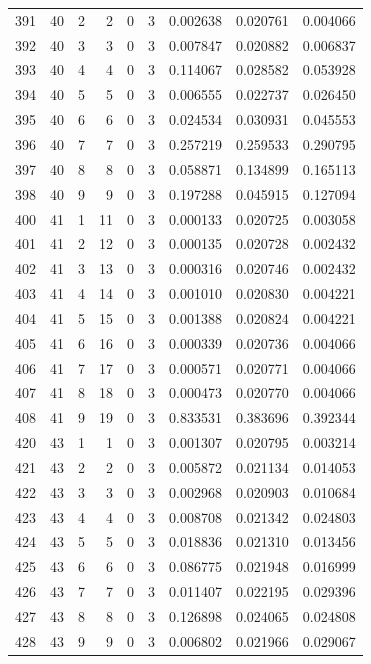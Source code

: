 \begin{longtable}{rrrrrrrrr}
391 & 40 & 2 & 2 & 0 & 3 & 0.002638 & 0.020761 & 0.004066 \\
392 & 40 & 3 & 3 & 0 & 3 & 0.007847 & 0.020882 & 0.006837 \\
393 & 40 & 4 & 4 & 0 & 3 & 0.114067 & 0.028582 & 0.053928 \\
394 & 40 & 5 & 5 & 0 & 3 & 0.006555 & 0.022737 & 0.026450 \\
395 & 40 & 6 & 6 & 0 & 3 & 0.024534 & 0.030931 & 0.045553 \\
396 & 40 & 7 & 7 & 0 & 3 & 0.257219 & 0.259533 & 0.290795 \\
397 & 40 & 8 & 8 & 0 & 3 & 0.058871 & 0.134899 & 0.165113 \\
398 & 40 & 9 & 9 & 0 & 3 & 0.197288 & 0.045915 & 0.127094 \\
400 & 41 & 1 & 11 & 0 & 3 & 0.000133 & 0.020725 & 0.003058 \\
401 & 41 & 2 & 12 & 0 & 3 & 0.000135 & 0.020728 & 0.002432 \\
402 & 41 & 3 & 13 & 0 & 3 & 0.000316 & 0.020746 & 0.002432 \\
403 & 41 & 4 & 14 & 0 & 3 & 0.001010 & 0.020830 & 0.004221 \\
404 & 41 & 5 & 15 & 0 & 3 & 0.001388 & 0.020824 & 0.004221 \\
405 & 41 & 6 & 16 & 0 & 3 & 0.000339 & 0.020736 & 0.004066 \\
406 & 41 & 7 & 17 & 0 & 3 & 0.000571 & 0.020771 & 0.004066 \\
407 & 41 & 8 & 18 & 0 & 3 & 0.000473 & 0.020770 & 0.004066 \\
408 & 41 & 9 & 19 & 0 & 3 & 0.833531 & 0.383696 & 0.392344 \\
420 & 43 & 1 & 1 & 0 & 3 & 0.001307 & 0.020795 & 0.003214 \\
421 & 43 & 2 & 2 & 0 & 3 & 0.005872 & 0.021134 & 0.014053 \\
422 & 43 & 3 & 3 & 0 & 3 & 0.002968 & 0.020903 & 0.010684 \\
423 & 43 & 4 & 4 & 0 & 3 & 0.008708 & 0.021342 & 0.024803 \\
424 & 43 & 5 & 5 & 0 & 3 & 0.018836 & 0.021310 & 0.013456 \\
425 & 43 & 6 & 6 & 0 & 3 & 0.086775 & 0.021948 & 0.016999 \\
426 & 43 & 7 & 7 & 0 & 3 & 0.011407 & 0.022195 & 0.029396 \\
427 & 43 & 8 & 8 & 0 & 3 & 0.126898 & 0.024065 & 0.024808 \\
428 & 43 & 9 & 9 & 0 & 3 & 0.006802 & 0.021966 & 0.029067 \\

\end{longtable}

